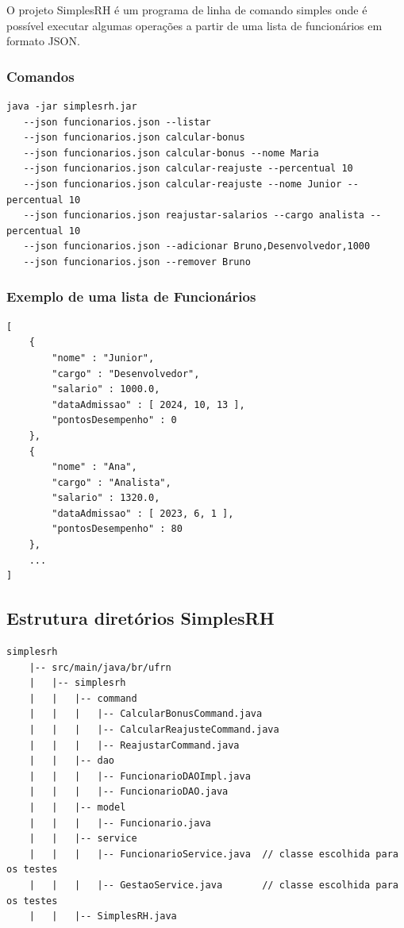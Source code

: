 \documentclass[10pt]{article}
\begin{document}
O projeto SimplesRH é um programa de linha de comando simples onde é possível executar algumas operações a partir de uma lista de funcionários em formato JSON.

\vspace{0.25cm}

\break
\subsubsection{Comandos}
\begin{mdframed}[backgroundcolor=gray!10]
\begin{lstlisting}[style=Raw]
java -jar simplesrh.jar
   --json funcionarios.json --listar
   --json funcionarios.json calcular-bonus
   --json funcionarios.json calcular-bonus --nome Maria
   --json funcionarios.json calcular-reajuste --percentual 10
   --json funcionarios.json calcular-reajuste --nome Junior --percentual 10
   --json funcionarios.json reajustar-salarios --cargo analista --percentual 10
   --json funcionarios.json --adicionar Bruno,Desenvolvedor,1000
   --json funcionarios.json --remover Bruno
\end{lstlisting}
\end{mdframed}

\subsubsection{Exemplo de uma lista de Funcionários}
\begin{mdframed}[backgroundcolor=gray!10]
\begin{lstlisting}[style=Raw]
[
    {
        "nome" : "Junior",
        "cargo" : "Desenvolvedor",
        "salario" : 1000.0,
        "dataAdmissao" : [ 2024, 10, 13 ],
        "pontosDesempenho" : 0
    },
    {
        "nome" : "Ana",
        "cargo" : "Analista",
        "salario" : 1320.0,
        "dataAdmissao" : [ 2023, 6, 1 ],
        "pontosDesempenho" : 80
    },
    ...
]
\end{lstlisting}
\end{mdframed}

\subsection{Estrutura diretórios SimplesRH}

\begin{mdframed}[backgroundcolor=gray!10]
\begin{lstlisting}[style=Raw]
    simplesrh
    |-- src/main/java/br/ufrn
    |   |-- simplesrh
    |   |   |-- command
    |   |   |   |-- CalcularBonusCommand.java
    |   |   |   |-- CalcularReajusteCommand.java
    |   |   |   |-- ReajustarCommand.java
    |   |   |-- dao
    |   |   |   |-- FuncionarioDAOImpl.java
    |   |   |   |-- FuncionarioDAO.java
    |   |   |-- model
    |   |   |   |-- Funcionario.java
    |   |   |-- service
    |   |   |   |-- FuncionarioService.java  // classe escolhida para os testes
    |   |   |   |-- GestaoService.java       // classe escolhida para os testes
    |   |   |-- SimplesRH.java
\end{lstlisting}
\end{mdframed}
\end{document}
